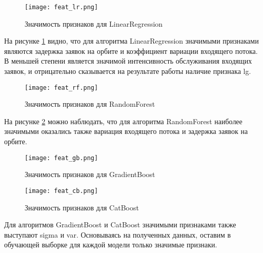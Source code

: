 \begin{figure}[H]
	\centering
	\texttt{[image: feat\_lr.png]}
	\caption{Значимость признаков для LinearRegression}
	\label{feat_lr}
\end{figure}
На рисунке \ref{feat_lr} видно, что для алгоритма LinearRegression значимыми признаками являются задержка заявок на орбите и коэффициент вариации входящего потока. В меньшей степени является значимой интенсивность обслуживания входящих заявок, и отрицательно сказывается на результате работы наличие признака lg.
\begin{figure}[H]
	\centering
	\texttt{[image: feat\_rf.png]}
	\caption{Значимость признаков для RandomForest}
	\label{feat_rf}
\end{figure}
На рисунке \ref{feat_rf} можно наблюдать, что для алгоритма RandomForest наиболее значимыми оказались также вариация входящего потока и задержка заявок на орбите.
\begin{figure}[H]
	\centering
	\texttt{[image: feat\_gb.png]}
	\caption{Значимость признаков для GradientBoost}
	\label{feat_gb}
\end{figure}
\begin{figure}[H]
	\centering
	\texttt{[image: feat\_cb.png]}
	\caption{Значимость признаков для CatBoost}
	\label{feat_cb}
\end{figure}
Для алгоритмов GradientBoost и CatBoost значимыми признаками также выступают sigma и var. Основываясь на полученных данных, оставим в обучающей выборке для каждой модели только значимые признаки.

